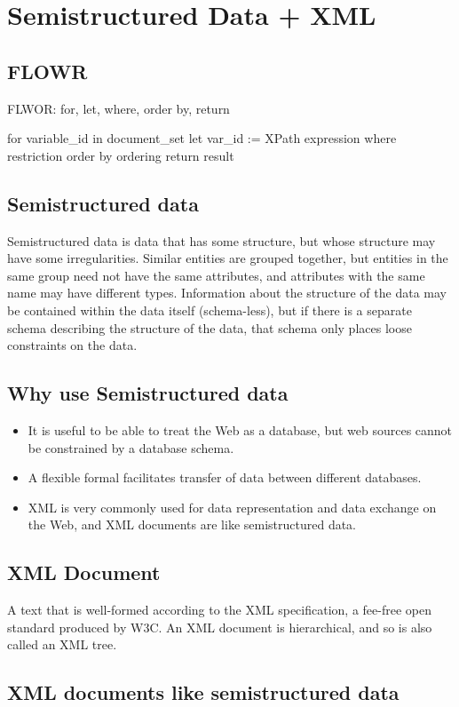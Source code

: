 \documentclass[10pt]{article}
\begin{document}
  \section*{Semistructured Data + XML}
    \subsection*{FLOWR}
    FLWOR: for, let, where, order by, return

    for variable\_id in document\_set 
    let var\_id := XPath expression 
    where restriction
    order by ordering
    return result
    \subsection*{Semistructured data}
        Semistructured data is data that has some structure, but whose structure may have some irregularities. Similar entities are grouped together, but entities in the same group need not have the same attributes, and attributes with the same name may have different types.
        Information about the structure of the data may be contained within the data itself (schema-less), but if there is a separate schema describing the structure of the data, that schema only places loose constraints on the data.
        \subsection*{Why use Semistructured data}
          \begin{itemize}
            \item It is useful to be able to treat the Web as a database, but web sources cannot be constrained by a database schema.
            \item A flexible formal facilitates transfer of data between different databases.
            \item XML is very commonly used for data representation and data exchange on the Web, and XML documents are like semistructured data.
          \end{itemize}
        
        \subsection*{XML Document}
          A text that is well-formed according to the XML specification, a fee-free open standard produced by W3C. An XML document is hierarchical, and so is also called an XML tree.
        \subsection*{XML documents like semistructured data}
\end{document}
